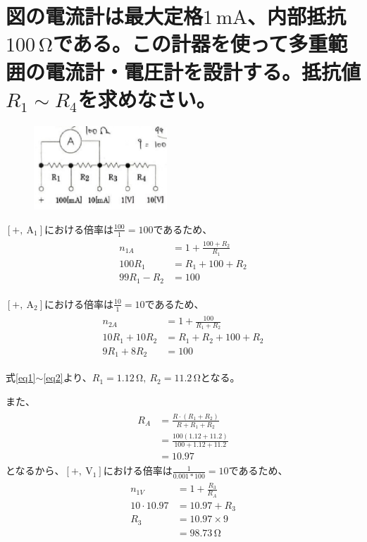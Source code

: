 \documentclass[a4paper,11pt]{jsarticle}
\begin{document}
\title{}
\author{}
\date{\today}


\section{図の電流計は最大定格$1\mathrm{\,\si{\milli \ampere}}$、内部抵抗$100\mathrm{\,\si{\ohm}}$である。この計器を使って多重範囲の電流計・電圧計を設計する。抵抗値$R_{1}\sim R_{4}$を求めなさい。}
\begin{figure}[htbp]
  \centering
  \includegraphics[width=5cm]{fig1.eps}
  \caption{}\label{fig1}
\end{figure}

$[+,\ \mathrm{A_{1}}]$における倍率は$\frac{100}{1}=100$であるため、
\begin{align}
  \begin{split}
    n_{1A}
    &=1+\frac{100+R_{2}}{R_{1}}\\
    100R_{1}
    &=R_{1}+100+R_{2}\\
    99R_{1}-R_{2}
    &=100
    \label{eq1}
  \end{split}
\end{align}

$[+,\ \mathrm{A_{2}}]$における倍率は$\frac{10}{1}=10$であるため、
\begin{align}
  \begin{split}
    n_{2A}
    &=1+\frac{100}{R_{1}+R_{2}}\\
    10R_{1}+10R_{2}
    &=R_{1}+R_{2}+100+R_{2}\\
    9R_{1}+8R_{2}
    &=100
    \label{eq2}
  \end{split}
\end{align}

式\eqref{eq1}$\sim $\eqref{eq2}より、$R_{1}=1.12\mathrm{\,\si{\ohm}},\ R_{2}=11.2\mathrm{\,\si{\ohm}}$となる。

また、
\begin{align}
  \begin{split}
    R_{A}
    &=\frac{R\cdot (R_{1}+R_{2})}{R+R_{1}+R_{2}}\\
    &=\frac{100(1.12+11.2)}{100+1.12+11.2}\\
    &=10.97
    \label{eq3}
  \end{split}
\end{align}
となるから、$[+,\ \mathrm{V_{1}}]$における倍率は$\frac{1}{0.001*100}=10$であるため、
\begin{align}
  \begin{split}
    n_{1V}
    &=1+\frac{R_{3}}{R_{A}}\\
    10\cdot 10.97
    &=10.97+R_{3}\\
    R_{3}
    &=10.97\times 9\\
    &=98.73\mathrm{\,\si{\ohm}}
    \label{eq4}
  \end{split}
\end{align}
\end{document}
